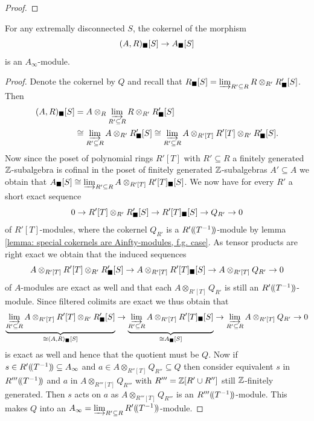 \begin{proof}
\end{proof}

\begin{lemma}
	\label{lemma: special cokernels are Ainfty-modules, general case}
	
	For any extremally disconnected $S$, the cokernel of the morphism
		$${(A, R)_\blacksquare[S]} \to {A_\blacksquare[S]}$$
	is an $A_\infty$-module.
\end{lemma}
\begin{proof}
	
	Denote the cokernel by $Q$ and recall that ${R_\blacksquare[S]} = \varinjlim_{R'\subseteq R} R\otimes_{R'} {R'_\blacksquare[S]}$. Then
	\begin{align*}
		{(A, R)_\blacksquare[S]} &= A\otimes_{R} \varinjlim_{R'\subseteq R} R\otimes_{R'}{R'_\blacksquare[S]}\\
		&\cong  \varinjlim_{R'\subseteq R} A\otimes_{R'}{R'_\blacksquare[S]}\cong \varinjlim_{R'\subseteq R} A\otimes_{R'[T]} R'[T] \otimes_{R'} {R'_\blacksquare[S]}.
	\end{align*}
	 Now since the poset of polynomial rings $R'[T]$ with $R'\subseteq R$ a finitely generated ${\mathbb{Z}}$-subalgebra is cofinal in the poset of finitely generated ${\mathbb{Z}}$-subalgebras $A'\subseteq A$ we obtain that ${A_\blacksquare[S]} \cong \varinjlim_{R'\subseteq R} A\otimes_{R'[T]} {R'[T]_\blacksquare[S]}$. We now have for every $R'$ a short exact sequence
	 	$$0\to R'[T]\otimes_{R'}{R'_\blacksquare[S]} \to {R'[T]_\blacksquare[S]} \to Q_{R'} \to 0$$
	 of $R'[T]$-modules, where the cokernel $Q_{R'}$ is a ${R'(\!(T^{-1})\!)}$-module by lemma \ref{lemma: special cokernels are Ainfty-modules, f.g. case}. As tensor products are right exact we obtain that the induced sequences
	 	$$A\otimes_{R'[T]} R'[T]\otimes_{R'} {R'_\blacksquare[S]} \to A\otimes_{R'[T]} {R'[T]_\blacksquare[S]} \to A\otimes_{R'[T]} Q_{R'} \to 0$$
	 of $A$-modules are exact as well and that each $A\otimes_{R'[T]} Q_{R'}$ is still an ${R'(\!(T^{-1})\!)}$-module. Since filtered colimits are exact we thus obtain that
 		$$\underbrace{\varinjlim_{R'\subseteq R} A\otimes_{R'[T]} R'[T]\otimes_{R'} {R'_\blacksquare[S]}}_{\cong {(A, R)_\blacksquare[S]}} \to \underbrace{\varinjlim_{R'\subseteq R} A\otimes_{R'[T]} {R'[T]_\blacksquare[S]}}_{\cong {A_\blacksquare[S]}} \to \varinjlim_{R'\subseteq R} A\otimes_{R'[T]} Q_{R'} \to 0$$
 	is exact as well and hence that the quotient must be $Q$. Now if $s\in {R'(\!(T^{-1})\!)}\subseteq A_\infty$ and $a \in A\otimes_{R''[T]} Q_{R''} \subseteq Q$ then consider equivalent $s$ in ${R'''(\!(T^{-1})\!)}$ and $a$ in $A\otimes_{R'''[T]}Q_{R'''}$ with $R'''={\mathbb{Z}}[R'\cup R'']$ still ${\mathbb{Z}}$-finitely generated. Then $s$ acts on $a$ as $A\otimes_{R'''[T]}Q_{R'''}$ is an ${R'''(\!(T^{-1})\!)}$-module. This makes $Q$ into an $A_\infty = \varinjlim_{R'\subseteq R} {R'(\!(T^{-1})\!)}$-module.
\end{proof}

